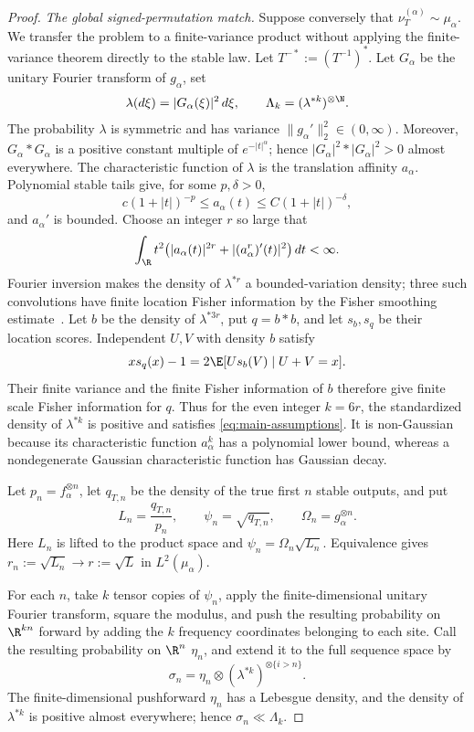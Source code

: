 \begin{proof}
\emph{The global signed-permutation match.}
Suppose conversely that \(\nu_T^{(\alpha)}\sim\mu_\alpha\).
We transfer the problem to a finite-variance product without applying the
finite-variance theorem directly to the stable law.
Let \(T^{-*}:=(T^{-1})^*\).
Let \(G_\alpha\) be the unitary Fourier transform of \(g_\alpha\), set
\[
 \lambda(d\xi)=|G_\alpha(\xi)|^2\,d\xi,
 \qquad \Lambda_k=(\lambda^{*k})^{\otimes\N}.
\]
The probability \(\lambda\) is symmetric and has variance
\(\|g_\alpha'\|_2^2\in(0,\infty)\).
Moreover, \(G_\alpha*G_\alpha\) is a positive constant multiple of
\(e^{-|t|^\alpha}\); hence
\(|G_\alpha|^2*|G_\alpha|^2>0\) almost everywhere.
The characteristic function of \(\lambda\) is the translation affinity
\(a_\alpha\).
Polynomial stable tails give, for some \(p,\delta>0\),
\[
 c(1+|t|)^{-p}\le a_\alpha(t)
 \le C(1+|t|)^{-\delta},
\]
and \(a_\alpha'\) is bounded.
Choose an integer \(r\) so large that
\[
 \int_\R t^2\bigl(|a_\alpha(t)|^{2r}
                 +|(a_\alpha^r)'(t)|^2\bigr)\,dt<\infty.
\]
Fourier inversion makes the density of \(\lambda^{*r}\) a bounded-variation
density; three such convolutions have finite location Fisher information by
the Fisher smoothing estimate~\cite{bobkov2014stable}.
Let \(b\) be the density of \(\lambda^{*3r}\), put \(q=b*b\), and let
\(s_b,s_q\) be their location scores.
Independent \(U,V\) with density \(b\) satisfy
\[
 x s_q(x)-1=2\E[U s_b(V)\mid U+V=x].
\]
Their finite variance and the finite Fisher information of \(b\) therefore
give finite scale Fisher information for \(q\).
Thus for the even integer \(k=6r\), the standardized density of
\(\lambda^{*k}\) is positive and satisfies
\eqref{eq:main-assumptions}.
It is non-Gaussian because its characteristic function
\(a_\alpha^k\) has a polynomial lower bound, whereas a nondegenerate
Gaussian characteristic function has Gaussian decay.

Let \(p_n=f_\alpha^{\otimes n}\), let \(q_{T,n}\) be the density of the
true first \(n\) stable outputs, and put
\[
 L_n=\frac{q_{T,n}}{p_n},
 \qquad
 \psi_n=\sqrt{q_{T,n}},
 \qquad
 \Omega_n=g_\alpha^{\otimes n}.
\]
Here \(L_n\) is lifted to the product space and
\(\psi_n=\Omega_n\sqrt{L_n}\).
Equivalence gives
\(r_n:=\sqrt{L_n}\to r:=\sqrt L\) in \(L^2(\mu_\alpha)\).

For each \(n\), take \(k\) tensor copies of \(\psi_n\), apply the
finite-dimensional unitary Fourier transform, square the modulus, and push
the resulting probability on \(\R^{kn}\) forward by adding the \(k\)
frequency coordinates belonging to each site.
Call the resulting probability on \(\R^n\) \(\eta_n\), and extend it to
the full sequence space by
\begin{equation}
 \sigma_n=\eta_n\otimes
       (\lambda^{*k})^{\otimes\{i>n\}}.
 \label{eq:stable-fourier-transfer-approximants}
\end{equation}
The finite-dimensional pushforward \(\eta_n\) has a Lebesgue density, and
the density of \(\lambda^{*k}\) is positive almost everywhere; hence
\(\sigma_n\ll\Lambda_k\).


\end{proof}

